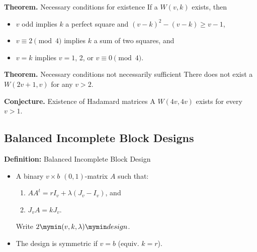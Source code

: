\documentclass{beamer}
\newcommand{\bibd}[1]{2 \mymin #1 \mymin design}
\begin{document}
\begin{frame}

  \begin{block}{{\bf Theorem.} Necessary conditions for existence}
    If a $W(v,k)$ exists, then
    \begin{itemize}
    \item $v$ odd implies $k$ a perfect square and $(v-k)^2-(v-k) \geq v-1$,
    \item $v \equiv 2 \pmod{4}$ implies $k$ a sum of two squares, and
    \item $v=k$ implies $v = 1$, 2, or $v \equiv 0 \pmod{4}$.
    \end{itemize}
  \end{block}

  \begin{block}{{\bf Theorem.} Necessary conditions not necessarily sufficient}
    There does not exist a $W(2v+1,v)$ for any $v>2$.
  \end{block}

  \begin{exampleblock}{{\bf Conjecture.} Existence of Hadamard matrices}
    A $W(4v,4v)$ exists for every $v>1$.
  \end{exampleblock}
  
\end{frame}


\subsection{Balanced Incomplete Block Designs}

\begin{frame}

  \begin{block}{{\bf Definition:} Balanced Incomplete Block Design}
    \begin{itemize}
    \item A binary $v \times b$ $(0,1)$-matrix $A$ such that:
      \begin{enumerate}
      \item $AA^t = rI_v + \lambda(J_v-I_v)$, and
      \item $J_vA = kJ_v$.
      \end{enumerate}
      Write $\bibd{(v,k,\lambda)}$.
    \item The design is symmetric if $v=b$ (equiv. $k=r$).
    \end{itemize}
  \end{block}

\end{frame}
\end{document}
